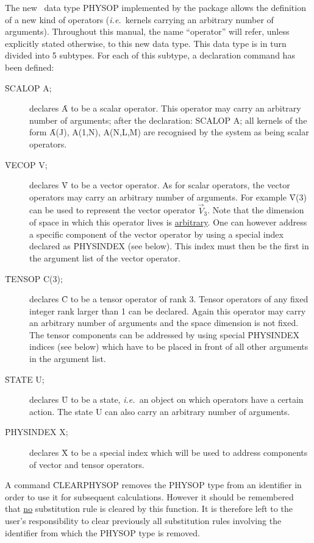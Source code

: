 The new \REDUCE\ data type PHYSOP implemented by the package allows the
definition of a new kind of operators ({\em i.e.\ }kernels carrying
an arbitrary
number of arguments). Throughout this manual, the name
``operator''
will refer, unless explicitly stated otherwise, to this new data type.
This data type is in turn
divided into 5 subtypes.  For each of this subtype, a declaration command
has been defined:
\begin{description}
\item[\f{SCALOP A;} ] declares \f{A} to be a scalar
operator. This operator may
carry an arbitrary number of arguments; after the
declaration: \f{ SCALOP A; }
all kernels of the form
\f{A(J), A(1,N), A(N,L,M)}
are recognised by the system as being scalar operators.

\item[\f{VECOP V;} ] declares \f{V} to be a vector operator.
As for scalar operators, the vector operators may carry an arbitrary
number of arguments. For example \f{V(3)} can be used to represent
the vector operator $\vec{V}_{3}$. Note that the dimension of space
in which this operator lives is \underline{arbitrary}.
One can however address a specific component of the
vector operator by using a special index declared as \f{PHYSINDEX} (see
below). This index must then be the first in the argument list
of the vector operator.

\item[\f{TENSOP C(3);} ] 
declares \f{C} to be a tensor operator of rank 3. Tensor operators
of any fixed integer rank larger than 1 can be declared.
Again this operator may carry an arbitrary number of arguments
and the space dimension is not fixed.
The tensor
components can be addressed by using  special \f{PHYSINDEX} indices
(see below) which have to be placed in front of all other
arguments in the argument list.


\item[\f{STATE U;} ] declares \f{U} to be a state, {\em i.e.\ }an
object on
which operators have a certain action.  The state  U can also carry an
arbitrary number of arguments.

\item[\f{PHYSINDEX X;} ] declares \f{X} to be a special
index which will be used
to address components of vector and tensor operators.
\end{description}


A command \f{CLEARPHYSOP}
removes
the PHYSOP type from an identifier in order to use it for subsequent
calculations.  However it should be
remembered that \underline{no}
substitution rule is cleared by this function. It
is therefore left to the user's responsibility to clear previously all
substitution rules involving the identifier from which the PHYSOP type
is removed.

